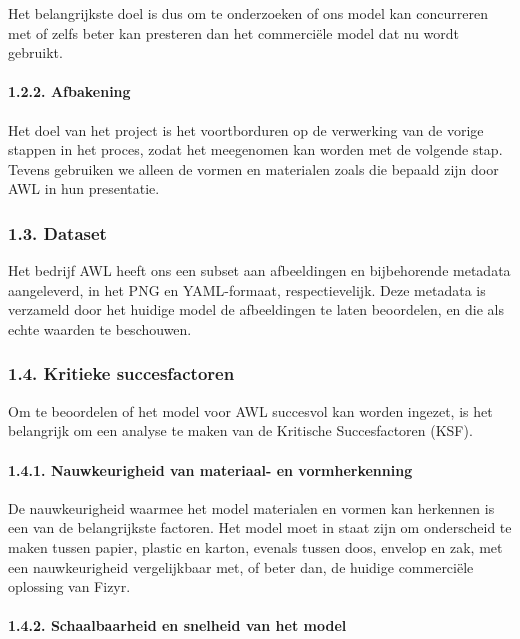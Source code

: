 \documentclass[11pt]{article}
\begin{document}
Het belangrijkste doel is dus om te onderzoeken of ons model kan
concurreren met of zelfs beter kan presteren dan het commerciële model
dat nu wordt gebruikt.

\paragraph{1.2.2. Afbakening}\label{afbakening}

Het doel van het project is het voortborduren op de verwerking van de
vorige stappen in het proces, zodat het meegenomen kan worden met de
volgende stap. Tevens gebruiken we alleen de vormen en materialen zoals
die bepaald zijn door AWL in hun presentatie.

\subsubsection{1.3. Dataset}\label{dataset}

Het bedrijf AWL heeft ons een subset aan afbeeldingen en bijbehorende
metadata aangeleverd, in het PNG en YAML-formaat, respectievelijk. Deze
metadata is verzameld door het huidige model de afbeeldingen te laten
beoordelen, en die als echte waarden te beschouwen.

    \subsubsection{1.4. Kritieke
succesfactoren}\label{kritieke-succesfactoren}

Om te beoordelen of het model voor AWL succesvol kan worden ingezet, is
het belangrijk om een analyse te maken van de Kritische Succesfactoren
(KSF).

\paragraph{1.4.1. Nauwkeurigheid van materiaal- en
vormherkenning}\label{nauwkeurigheid-van-materiaal--en-vormherkenning}

De nauwkeurigheid waarmee het model materialen en vormen kan herkennen
is een van de belangrijkste factoren. Het model moet in staat zijn om
onderscheid te maken tussen papier, plastic en karton, evenals tussen
doos, envelop en zak, met een nauwkeurigheid vergelijkbaar met, of beter
dan, de huidige commerciële oplossing van Fizyr.

\paragraph{1.4.2. Schaalbaarheid en snelheid van het
model}\label{schaalbaarheid-en-snelheid-van-het-model}
\end{document}
